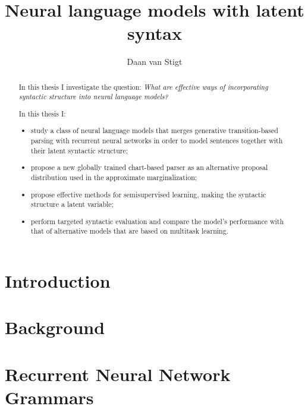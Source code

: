 \documentclass{uvamath}
\title{Neural language models with latent syntax}
\author{Daan van Stigt}
\theoremstyle{remark}
\theoremstyle{definition}
\theoremstyle{definition}
\theoremstyle{definition}
\theoremstyle{definition}
\theoremstyle{definition}
\begin{document}
\maketitle

\begin{abstract}
  In this thesis I investigate the question: \textit{What are effective ways of incorporating syntactic structure into neural language models?}

  In this thesis I:
  \begin{itemize}
    \item study a class of neural language models that merges generative transition-based parsing with recurrent neural networks in order to model sentences together with their latent syntactic structure;
    \item propose a new globally trained chart-based parser as an alternative proposal distribution used in the approximate marginalization;
    \item propose effective methods for semisupervised learning, making the syntactic structure a latent variable;
    \item perform targeted syntactic evaluation and compare the model's performance with that of alternative models that are based on multitask learning.
  \end{itemize}
\end{abstract}





{\hypersetup{linkcolor=black}
\tableofcontents
}


\begin{acknowledgements}
\end{acknowledgements}


\chapter{Introduction}
\label{01-introduction}



\chapter{Background}
\label{02-background}



\chapter{Recurrent Neural Network Grammars}
\label{03-rnng}

\end{document}

